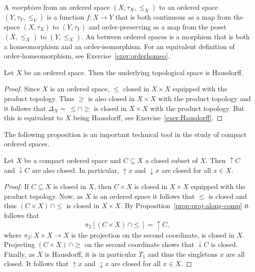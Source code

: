 A \emph{morphism} from an ordered space $(X, \tau_X, \leq_X)$ to an ordered space $(Y, \tau_Y, \leq_Y)$ is a function $f \colon X \to Y$ that is both continuous as a map from the space $(X, \tau_X)$ to $(Y,\tau_Y)$ and order-preserving as a map from the poset $(X, \leq_X)$ to $(Y, \leq_X)$. An  between ordered spaces is a morphism that is both a homeomorphism and an order-isomorphism. For an equivalent definition of order-homeomorphism, see Exercise~\ref{exer:orderhomeo}.

\begin{proposition}
Let $X$ be an ordered space. Then the underlying topological space is Hausdorff.
\end{proposition}

\begin{proof}
Since $X$ is an ordered space, $\leq$ closed in $X\times X$ equipped with the product topology. Thus $\geq$ is also closed in $X\times X$ with the product topology and it follows that $\Delta_X=\,\leq\cap\geq$ is closed in $X\times X$ with the product topology. But this is equivalent to $X$ being Hausdorff, see Exercise~\ref{exer:Hausdorff}.
\end{proof}

The following proposition is an important technical tool in the study of compact ordered spaces.

\begin{proposition}\label{prop:cos-closed}
Let $X$ be a compact ordered space and $C\subseteq X$ a closed subset of $X$. Then ${\uparrow}C$ and ${\downarrow}C$ are also closed. In particular, ${\uparrow}x$ and ${\downarrow}x$ are closed for all $x\in X$.
\end{proposition}

\begin{proof}
If $C\subseteq X$ is closed in $X$, then $C\times X$ is closed in $X\times X$ equipped with the product topology. Now, as $X$ is an ordered space it follows that $\leq$ is closed and thus $(C\times X)\,\cap\leq$ is closed in $X\times X$. By Proposition~\ref{prop:proj-along-comp} it follows that
\[
\pi_2[(C\times X)\,\cap\leq]={\uparrow}C,
\]
where $\pi_2\colon X\times X\to X$ is the projection on the second coordinate, is closed in $X$. Projecting $(C\times X)\,\cap\geq$ on the second coordinate shows that ${\downarrow}C$ is closed. Finally, as $X$ is Hausdorff, it is in particular $T_1$ and thus the singletons $x$ are all closed. It follows that ${\uparrow}x$ and ${\downarrow}x$ are closed for all $x\in X$.
\end{proof}

